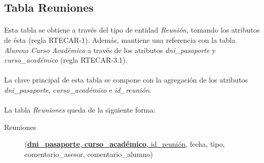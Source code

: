    \subsection{Tabla Reuniones}

      \paragraph{}Esta tabla se obtiene a través del tipo de entidad
      \textit{Reunión}, tomando los atributos de ésta (regla RTECAR-1).
      Además, mantiene una referencia con la tabla \textit{Alumno Curso
      Académico} a través de los atributos \textit{dni\_pasaporte} y
      \textit{curso\_académico} (regla RTECAR-3.1).

      \paragraph{}La clave principal de esta tabla se compone con la agregación
      de los atributos \textit{dni\_pasaporte}, \textit{curso\_académico} e
      \textit{id\_reunión}.

      \paragraph{}La tabla \textit{Reuniones} queda de la siguiente forma:

      \begin{description}
         \item[Reuniones] \begin{flushleft}(\underline{\textbf{dni\_pasaporte},
         \textbf{curso\_académico}, id\_reunión}, fecha, tipo,
         comentario\_asesor, comentario\_alumno)\end{flushleft}
      \end{description}
